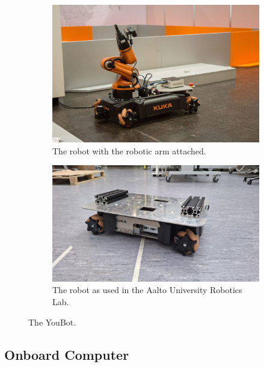 \documentclass[a4paper, 12pt]{article}
\newif\ifshownotes
\newcommand{\notes}[1]{\ifshownotes\textcolor{blue}{#1}\fi}
\begin{document}
    \begin{figure}[H]
        \centering
        \begin{subfigure}[t]{0.49\linewidth}
            \centering
            \includegraphics[width=\linewidth]{images/sec2/youbot_with_arm.png}
            \caption{The robot with the robotic arm attached. \notes{[cite]}}
        \end{subfigure}
        \hfill
        \begin{subfigure}[t]{0.49\linewidth}
            \centering
            \includegraphics[width=\linewidth]{images/sec2/youbot_irl.jpg}
            \caption{The robot as used in the Aalto University Robotics Lab.}
        \end{subfigure}
        \caption{The YouBot.}
    \end{figure}

    \subsection{Onboard Computer}
\end{document}
